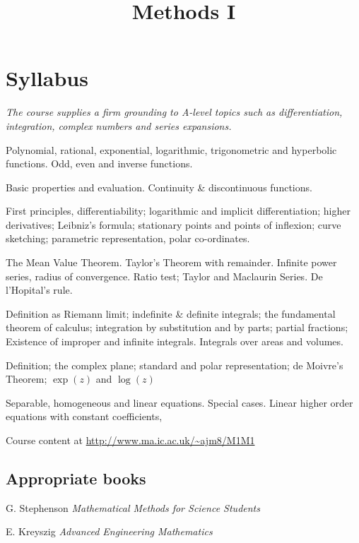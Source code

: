 \documentclass[twoside]{scrartcl}
\title{Methods I}
\begin{document}
{

\section*{Syllabus}
\textit{The course supplies a firm grounding to A-level topics such as differentiation, integration, complex numbers and series expansions.}

\vspace*{-5pt}
Polynomial, rational, exponential, logarithmic, trigonometric and hyperbolic functions. Odd, even and inverse functions.

\vspace*{-5pt}
 Basic properties and evaluation. Continuity \& discontinuous functions.

\vspace*{-5pt}
 First principles, differentiability; logarithmic and implicit differentiation; higher derivatives; Leibniz's formula; stationary points and points of inflexion; curve sketching; parametric representation, polar co-ordinates.
 
\vspace*{-5pt}
  The Mean Value Theorem. Taylor's Theorem with remainder. Infinite power series, radius of convergence. Ratio test; Taylor and Maclaurin Series. De l'Hopital's rule.
 
\vspace*{-5pt}
   Definition as Riemann limit; indefinite \& definite integrals; the fundamental theorem of calculus; integration by substitution and by parts; partial fractions; Existence of improper and infinite integrals. Integrals over areas and volumes.
  
  
\vspace*{-5pt}
  Definition; the complex plane; standard and polar representation; de Moivre's Theorem; $\exp(z)$ and $\log(z)$

\vspace*{-5pt}
  Separable, homogeneous and linear equations. Special cases. Linear higher order equations with constant coefficients,

Course content at \url{http://www.ma.ic.ac.uk/~ajm8/M1M1}\\

\subsection*{Appropriate books}

{\shortskip
G. Stephenson \emph{Mathematical Methods for Science Students}

E. Kreyszig \emph{Advanced Engineering Mathematics} 
}
}
\end{document}
